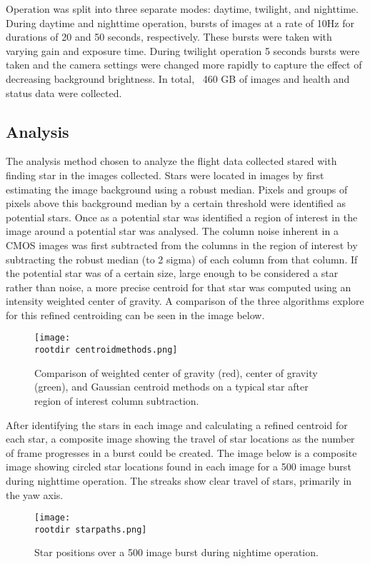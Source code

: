 \documentclass[twocolumn,letterpaper]{IEEEAerospace2012}
\newcommand{\rootdir}{./Figures/}
\begin{document}
Operation was split into three separate modes: daytime, twilight, and nighttime. During daytime and nighttime operation, bursts of images at a rate of 10Hz for durations of 20 and 50 seconds, respectively. These bursts were taken with varying gain and exposure time. During twilight operation 5 seconds bursts were taken and the camera settings were changed more rapidly to capture the effect of decreasing background brightness. In total, ~460 GB of images and health and status data were collected.

\subsection{Analysis}
The analysis method chosen to analyze the flight data collected stared with finding star in the images collected. Stars were located in images by first estimating the image background using a robust median. Pixels and groups of pixels above this background median by a certain threshold were identified as potential stars. Once as a potential star was identified a region of interest in the image around a potential star was analysed. The column noise inherent in a CMOS images was first subtracted from the columns in the region of interest by subtracting the robust median (to 2 sigma) of each column from that column. If the potential star was of a certain size, large enough to be considered a star rather than noise, a more precise centroid for that star was computed using an intensity weighted center of gravity. A comparison of the three algorithms explore for this refined centroiding can be seen in the image below. 

\begin{figure}
    \centering
    \texttt{[image: \\rootdir centroidmethods.png]}
    \caption{Comparison of weighted center of gravity (red), center of gravity (green), and Gaussian centroid methods on a typical star after region of interest column subtraction.}
    \label{fig:centroidmethods}
\end{figure}

After identifying the stars in each image and calculating a refined centroid for each star, a composite image showing the travel of star locations as the number of frame progresses in a burst could be created. The image below is a composite image showing circled star locations found in each image for a 500 image burst during nighttime operation. The streaks show clear travel of stars, primarily in the yaw axis.

\begin{figure}
    \centering
    \texttt{[image: \\rootdir starpaths.png]}
    \caption{Star positions over a 500 image burst during nightime operation.}
    \label{fig:starpaths}
\end{figure}
\end{document}

